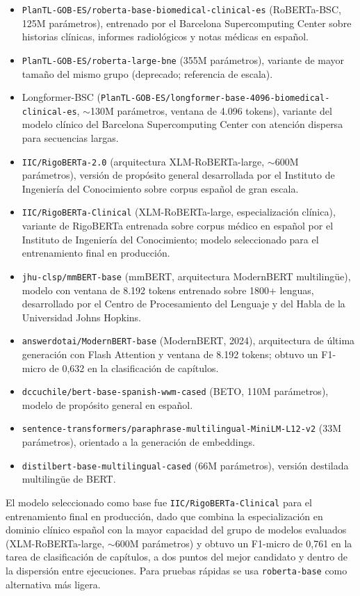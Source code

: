 \begin{itemize}
 \item \texttt{PlanTL-GOB-ES/roberta-base-biomedical-clinical-es} (RoBERTa-BSC, 125M parámetros), entrenado por el Barcelona Supercomputing Center sobre historias clínicas, informes radiológicos y notas médicas en español.
 \item \texttt{PlanTL-GOB-ES/roberta-large-bne} (355M parámetros), variante de mayor tamaño del mismo grupo (deprecado; referencia de escala).
 \item Longformer-BSC (\texttt{PlanTL-GOB-ES/\allowbreak{}longformer-base-4096-\allowbreak{}biomedical-clinical-es}, $\sim$130M parámetros, ventana de 4.096 tokens), variante del modelo clínico del Barcelona Supercomputing Center con atención dispersa para secuencias largas.
 \item \texttt{IIC/RigoBERTa-2.0} (arquitectura XLM-RoBERTa-large, $\sim$600M parámetros), versión de propósito general desarrollada por el Instituto de Ingeniería del Conocimiento sobre corpus español de gran escala.
 \item \texttt{IIC/RigoBERTa-Clinical} (XLM-RoBERTa-large, especialización clínica), variante de RigoBERTa entrenada sobre corpus médico en español por el Instituto de Ingeniería del Conocimiento; modelo seleccionado para el entrenamiento final en producción.
 \item \texttt{jhu-clsp/mmBERT-base} (mmBERT, arquitectura ModernBERT multilingüe), modelo con ventana de 8.192 tokens entrenado sobre 1800+ lenguas, desarrollado por el Centro de Procesamiento del Lenguaje y del Habla de la Universidad Johns Hopkins.
 \item \texttt{answerdotai/ModernBERT-base} (ModernBERT, 2024), arquitectura de última generación con Flash Attention y ventana de 8.192 tokens; obtuvo un F1-micro de 0{,}632 en la clasificación de capítulos.
 \item \texttt{dccuchile/bert-base-spanish-wwm-cased} (BETO, 110M parámetros), modelo de propósito general en español.
 \item \texttt{sentence-transformers/paraphrase-multilingual-MiniLM-L12-v2} (33M parámetros), orientado a la generación de embeddings.
 \item \texttt{distilbert-base-multilingual-cased} (66M parámetros), versión destilada multilingüe de BERT.
\end{itemize}

El modelo seleccionado como base fue \texttt{IIC/RigoBERTa-Clinical} para el entrenamiento final en producción, dado que combina la especialización en dominio clínico español con la mayor capacidad del grupo de modelos evaluados (XLM-RoBERTa-large, $\sim$600M parámetros) y obtuvo un F1-micro de 0{,}761 en la tarea de clasificación de capítulos, a dos puntos del mejor candidato y dentro de la dispersión entre ejecuciones. Para pruebas rápidas se usa \texttt{roberta-base} como alternativa más ligera.

